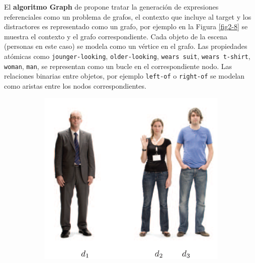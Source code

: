 El {\bf algoritmo Graph} de \cite{graph} propone tratar la generaci\'on de expresiones referenciales como un problema de grafos, el contexto que incluye al target y los distractores es representado como un grafo, por ejemplo en la Figura \ref{fig2-8} se muestra el contexto y el grafo correspondiente. Cada objeto de la escena (personas en este caso) se modela como un v\'ertice en el grafo. Las propiedades at\'omicas como \texttt{jounger-looking}, \texttt{older-looking}, \texttt{wears suit}, \texttt{wears t-shirt}, \texttt{woman}, \texttt{man}, se representan como un bucle en el correspondiente nodo. Las relaciones binarias entre objetos, por ejemplo \texttt{left-of} o \texttt{right-of} se modelan como aristas entre los nodos correspondientes.

\begin{figure}[!ht]
\begin{subfigure}{.35\textwidth}\centering
\centering
\includegraphics[width=\textwidth]{images/contexto-survey.png}\\[0pt]
\label{figura-survey}
\vspace*{.1cm}
\end{subfigure}
\hspace*{0cm}
\begin{subfigure}{.50\textwidth}\centering

\end{subfigure}
\end{figure}
